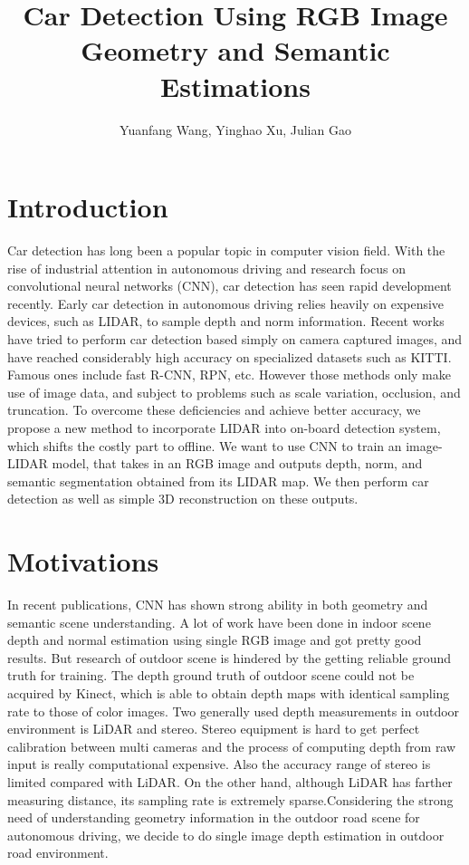 \documentclass[a4paper]{article}
\title{Car Detection Using RGB Image Geometry and Semantic Estimations}
\author{Yuanfang Wang, Yinghao Xu, Julian Gao}
\begin{document}
\maketitle


\section{Introduction}
Car detection has long been a popular topic in computer vision field. With the rise of industrial attention in autonomous driving and research focus on convolutional neural networks (CNN), car detection has seen rapid development recently. Early car detection in autonomous driving relies heavily on expensive devices, such as LIDAR, to sample depth and norm information. Recent works have tried to perform car detection based simply on camera captured images, and have reached considerably high accuracy on specialized datasets such as KITTI. Famous ones include fast R-CNN\cite{}, RPN\cite{}, etc. However those methods only make use of image data, and subject to problems such as scale variation, occlusion, and truncation\cite{}. To overcome these deficiencies and achieve better accuracy, we propose a new method to incorporate LIDAR into on-board detection system, which shifts the costly part to offline. We want to use CNN to train an image-LIDAR model, that takes in an RGB image and outputs depth, norm, and semantic segmentation obtained from its LIDAR map. We then perform car detection as well as simple 3D reconstruction on these outputs.

\section{Motivations}
In recent publications, CNN has shown strong ability in both geometry and semantic scene understanding. A lot of work have been done in indoor scene depth and normal estimation using single RGB image and got pretty good results\cite{laina2016deeper}\cite{li2015depth}\cite{hane2015direction}\cite{eigen2015predicting}. But research of outdoor scene is hindered by the getting reliable ground truth for training. The depth ground truth of outdoor scene could not be acquired by Kinect, which is able to obtain depth maps with identical sampling rate to those of color images. Two generally used depth measurements in outdoor environment is LiDAR and stereo. Stereo equipment is hard to get perfect calibration between multi cameras and the process of computing depth from raw input is really computational expensive. Also the accuracy range of stereo is limited compared with LiDAR. On the other hand, although LiDAR has farther measuring distance, its sampling rate is extremely sparse.Considering the strong need of understanding geometry information in the outdoor road scene for autonomous driving, we decide to do single image depth estimation in outdoor road environment. 
\end{document}
